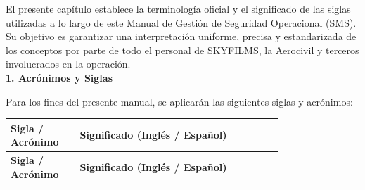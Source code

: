 El presente capítulo establece la terminología oficial y el significado de las siglas utilizadas a lo largo de este Manual de Gestión de Seguridad Operacional (SMS). Su objetivo es garantizar una interpretación uniforme, precisa y estandarizada de los conceptos por parte de todo el personal de SKYFILMS, la Aerocivil y terceros involucrados en la operación.\\

\textbf{1. Acrónimos y Siglas}

Para los fines del presente manual, se aplicarán las siguientes siglas y acrónimos:

\begin{longtable}{|>{\centering\arraybackslash}m{0.17\linewidth}|m{0.6\linewidth}|}
\hline
\rowcolor{gray!20}
\textbf{Sigla / Acrónimo} & \textbf{Significado (Inglés / Español)} \\
\hline
\endfirsthead %

\hline
\rowcolor{gray!20}
\textbf{Sigla / Acrónimo} & \textbf{Significado (Inglés / Español)} \\
\hline
\endhead %


\end{longtable}
